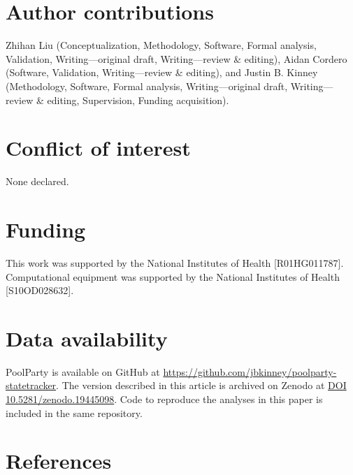 \documentclass[twoside]{kinneylab_preprintstyle}
\begin{document}
\section*{Author contributions}
Zhihan Liu (Conceptualization, Methodology, Software, Formal analysis, Validation, Writing---original draft, Writing---review \& editing), Aidan Cordero (Software, Validation, Writing---review \& editing), and Justin B. Kinney (Methodology, Software, Formal analysis, Writing---original draft, Writing---review \& editing, Supervision, Funding acquisition).

\section*{Conflict of interest}
None declared.

\section*{Funding}
This work was supported by the National Institutes of Health [R01HG011787]. Computational equipment was supported by the National Institutes of Health [S10OD028632].

\section*{Data availability}
PoolParty is available on GitHub at \url{https://github.com/jbkinney/poolparty-statetracker}. The version described in this article is archived on Zenodo at \href{https://zenodo.org/records/19445098}{DOI 10.5281/zenodo.19445098}. Code to reproduce the analyses in this paper is included in the same repository.

\section*{References}


\end{document}
